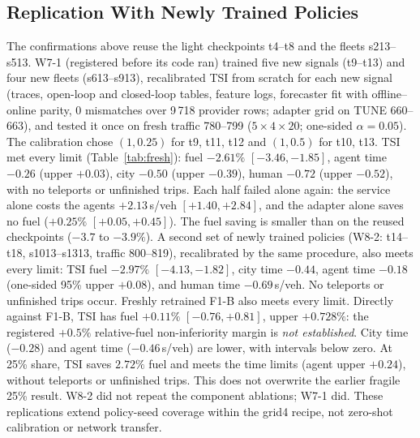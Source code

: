 \subsection{Replication With Newly Trained Policies}\label{sec:fresh}
The confirmations above reuse the light checkpoints t4--t8 and the fleets s213--s513. W7-1 (registered before its code ran) trained five
new signals (t9--t13) and four new fleets (s613--s913), recalibrated TSI from scratch for each new signal (traces, open-loop and closed-loop
tables, feature logs, forecaster fit with offline--online parity, 0 mismatches over 9\,718 provider rows; adapter grid on TUNE 660--663),
and tested it once on fresh traffic 780--799 ($5\times4\times20$; one-sided $\alpha=0.05$). The calibration chose $(1,0.25)$ for t9, t11,
t12 and $(1,0.5)$ for t10, t13. TSI met every limit (Table~\ref{tab:fresh}): fuel $-2.61\%$ $[-3.46,-1.85]$, agent time $-0.26$ (upper
$+0.03$), city $-0.50$ (upper $-0.39$), human $-0.72$ (upper $-0.52$), with no teleports or unfinished trips. Each half failed alone again:
the service alone costs the agents $+2.13$\,s/veh $[+1.40,+2.84]$, and the adapter alone saves no fuel ($+0.25\%$ $[+0.05,+0.45]$). The
fuel saving is smaller than on the reused checkpoints ($-3.7$ to $-3.9\%$). A second set of newly trained policies (W8-2: t14--t18, s1013--s1313, traffic 800--819), recalibrated by the same procedure, also meets every limit: TSI fuel $-2.97\%$ $[-4.13,-1.82]$, city time $-0.44$, agent time $-0.18$ (one-sided 95\% upper $+0.08$), and human time $-0.69$\,s/veh. No teleports or unfinished trips occur.
Freshly retrained F1-B also meets every limit. Directly against F1-B, TSI has fuel $+0.11\%$ $[-0.76,+0.81]$, upper $+0.728\%$: the registered $+0.5\%$ relative-fuel non-inferiority margin is \emph{not established}. City time ($-0.28$) and agent time ($-0.46$\,s/veh) are lower, with intervals below zero. At 25\% share, TSI saves $2.72\%$ fuel and meets the time limits (agent upper $+0.24$), without teleports or unfinished trips. This does not overwrite the earlier fragile 25\% result. W8-2 did not repeat the component ablations; W7-1 did. These replications extend policy-seed coverage within the grid4 recipe, not zero-shot calibration or network transfer.
